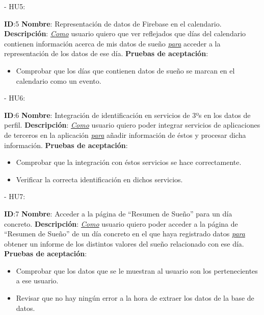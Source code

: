\documentclass[11pt,openany]{book}
\begin{document}
- HU5:
 
\textbf{ID}:5 \textbf{Nombre}: Representación de datos de Firebase en el calendario.\linebreak
\textbf{Descripción}: \textit{\underline{Como}} usuario quiero que ver reflejados que días del calendario contienen información acerca de mis datos de sueño \textit{\underline{para}} acceder a la representación de los datos de ese día.\linebreak
\textbf{Pruebas de aceptación}:
\begin{itemize}
\item Comprobar que los días que contienen datos de sueño se marcan en el calendario como un evento.
\end{itemize}
 


- HU6:
 
\textbf{ID}:6 \textbf{Nombre}: Integración de identificación en servicios de 3ºs en los datos de perfil.\linebreak
\textbf{Descripción}: \textit{\underline{Como}} usuario quiero poder integrar servicios de aplicaciones de terceros en la aplicación \textit{\underline{para}} añadir información de éstos y procesar dicha información.\linebreak
\textbf{Pruebas de aceptación}:
\begin{itemize}
\item Comprobar que la integración con éstos servicios se hace correctamente.
\item Verificar la correcta identificación en dichos servicios.
\end{itemize}
 
 
- HU7:
 
\textbf{ID}:7 \textbf{Nombre}: Acceder a la página de ``Resumen de Sueño'' para un día concreto.\linebreak
\textbf{Descripción}: \textit{\underline{Como}} usuario quiero poder acceder a la página de “Resumen de Sueño” de un día concreto en el que haya registrado datos \textit{\underline{para}} obtener un informe de los distintos valores del sueño relacionado con ese día.\linebreak
\textbf{Pruebas de aceptación}:
\begin{itemize}
\item Comprobar que los datos que se le muestran al usuario son los pertenecientes a ese usuario.
\item Revisar que no hay ningún error a la hora de extraer los datos de la base de datos.
\end{itemize}
 
\end{document}
